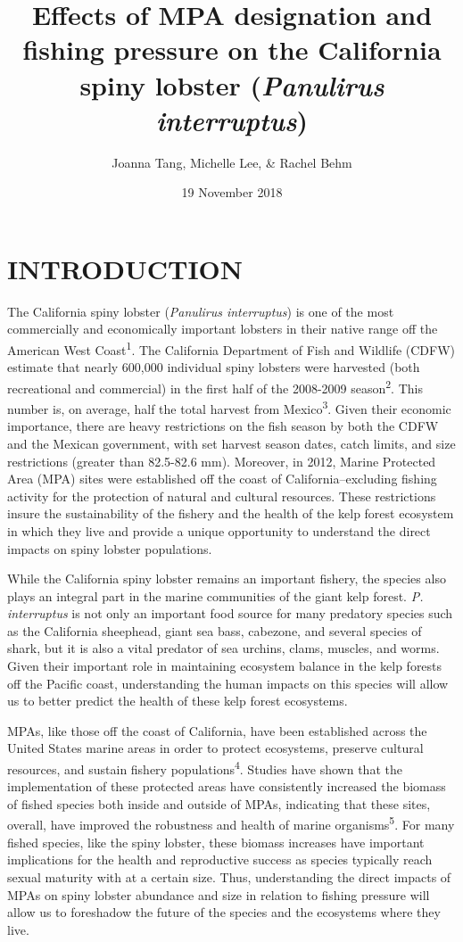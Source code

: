 \documentclass[]{article}
\title{Effects of MPA designation and fishing pressure on the California spiny
lobster (\emph{Panulirus interruptus})}
\author{Joanna Tang, Michelle Lee, \& Rachel Behm}
\date{19 November 2018}
\begin{document}
\maketitle

\centering
\raggedright
\newpage

\section{INTRODUCTION}\label{introduction}

The California spiny lobster (\emph{Panulirus interruptus}) is one of
the most commercially and economically important lobsters in their
native range off the American West Coast\textsuperscript{1}. The
California Department of Fish and Wildlife (CDFW) estimate that nearly
600,000 individual spiny lobsters were harvested (both recreational and
commercial) in the first half of the 2008-2009
season\textsuperscript{2}. This number is, on average, half the total
harvest from Mexico\textsuperscript{3}. Given their economic importance,
there are heavy restrictions on the fish season by both the CDFW and the
Mexican government, with set harvest season dates, catch limits, and
size restrictions (greater than 82.5-82.6 mm). Moreover, in 2012, Marine
Protected Area (MPA) sites were established off the coast of
California--excluding fishing activity for the protection of natural and
cultural resources. These restrictions insure the sustainability of the
fishery and the health of the kelp forest ecosystem in which they live
and provide a unique opportunity to understand the direct impacts on
spiny lobster populations.

While the California spiny lobster remains an important fishery, the
species also plays an integral part in the marine communities of the
giant kelp forest. \emph{P. interruptus} is not only an important food
source for many predatory species such as the California sheephead,
giant sea bass, cabezone, and several species of shark, but it is also a
vital predator of sea urchins, clams, muscles, and worms. Given their
important role in maintaining ecosystem balance in the kelp forests off
the Pacific coast, understanding the human impacts on this species will
allow us to better predict the health of these kelp forest ecosystems.

MPAs, like those off the coast of California, have been established
across the United States marine areas in order to protect ecosystems,
preserve cultural resources, and sustain fishery
populations\textsuperscript{4}. Studies have shown that the
implementation of these protected areas have consistently increased the
biomass of fished species both inside and outside of MPAs, indicating
that these sites, overall, have improved the robustness and health of
marine organisms\textsuperscript{5}. For many fished species, like the
spiny lobster, these biomass increases have important implications for
the health and reproductive success as species typically reach sexual
maturity with at a certain size. Thus, understanding the direct impacts
of MPAs on spiny lobster abundance and size in relation to fishing
pressure will allow us to foreshadow the future of the species and the
ecosystems where they live.
\end{document}

